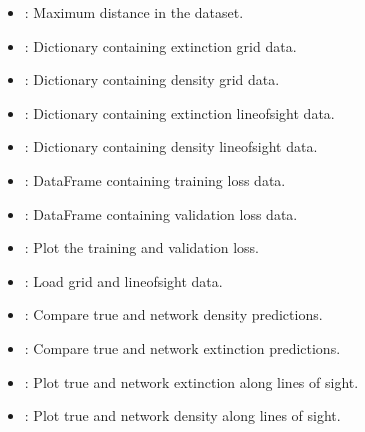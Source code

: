 \documentclass[letterpaper,10pt,english]{sphinxmanual}
\begin{document}
\begin{fulllineitems}
\begin{description}
\begin{itemize}
\item {} 
\sphinxAtStartPar
{}: Maximum distance in the dataset.

\item {} 
\sphinxAtStartPar
{}: Dictionary containing extinction grid data.

\item {} 
\sphinxAtStartPar
{}: Dictionary containing density grid data.

\item {} 
\sphinxAtStartPar
{}: Dictionary containing extinction line\sphinxhyphen{}of\sphinxhyphen{}sight data.

\item {} 
\sphinxAtStartPar
{}: Dictionary containing density line\sphinxhyphen{}of\sphinxhyphen{}sight data.

\item {} 
\sphinxAtStartPar
{}: DataFrame containing training loss data.

\item {} 
\sphinxAtStartPar
{}: DataFrame containing validation loss data.

\end{itemize}

\begin{itemize}
\item {} 
\sphinxAtStartPar
{}: Plot the training and validation loss.

\item {} 
\sphinxAtStartPar
{}: Load grid and line\sphinxhyphen{}of\sphinxhyphen{}sight data.

\item {} 
\sphinxAtStartPar
{}: Compare true and network density predictions.

\item {} 
\sphinxAtStartPar
{}: Compare true and network extinction predictions.

\item {} 
\sphinxAtStartPar
{}: Plot true and network extinction along lines of sight.

\item {} 
\sphinxAtStartPar
{}: Plot true and network density along lines of sight.


\end{itemize}
\end{description}
\end{fulllineitems}
\end{document}
